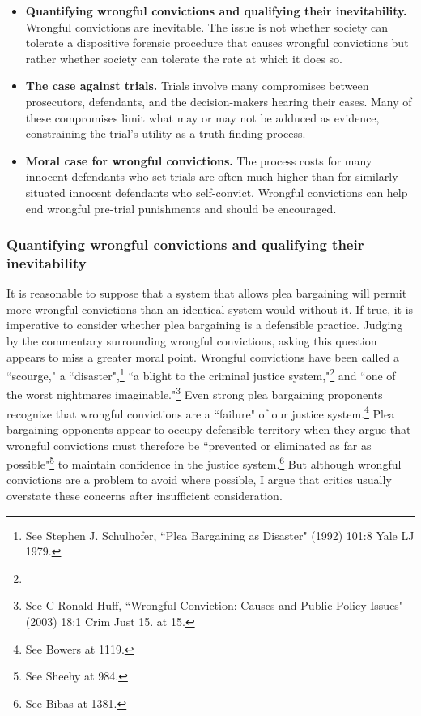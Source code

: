 \begin{itemize}
    \item \textbf{Quantifying wrongful convictions and qualifying their inevitability.} Wrongful convictions are inevitable. The issue is not whether society can tolerate a dispositive forensic procedure that causes wrongful convictions but rather whether society can tolerate the rate at which it does so.
    \item \textbf{The case against trials.} Trials involve many compromises between prosecutors, defendants, and the decision-makers hearing their cases. Many of these compromises limit what may or may not be adduced as evidence, constraining the trial's utility as a truth-finding process.
    \item \textbf{Moral case for wrongful convictions.} The process costs for many innocent defendants who set trials are often much higher than for similarly situated innocent defendants who self-convict. Wrongful convictions can help end wrongful pre-trial punishments and should be encouraged.
    
\end{itemize}

\subsubsection{Quantifying wrongful convictions and qualifying their inevitability}

It is reasonable to suppose that a system that allows plea bargaining will permit more wrongful convictions than an identical system would without it. If true, it is imperative to consider whether plea bargaining is a defensible practice. Judging by the commentary surrounding wrongful convictions, asking this question appears to miss a greater moral point. Wrongful convictions have been called a ``scourge,"\cite{} a ``disaster",\footnote{See Stephen J. Schulhofer, ``Plea Bargaining as Disaster" (1992) 101:8 Yale LJ 1979.} ``a blight to the criminal justice system,"\footnote{} and ``one of the worst nightmares imaginable."\footnote{See C Ronald Huff, ``Wrongful Conviction: Causes and Public Policy Issues" (2003) 18:1 Crim Just 15. at 15.} Even strong plea bargaining proponents recognize that wrongful convictions are a ``failure" of our justice system.\footnote{See Bowers at 1119.} Plea bargaining opponents appear to occupy defensible territory when they argue that wrongful convictions must therefore be ``prevented or eliminated as far as possible"\footnote{See Sheehy at 984.} to maintain confidence in the justice system.\footnote{See Bibas at 1381.} But although wrongful convictions are a problem to avoid where possible, I argue that critics usually overstate these concerns after insufficient consideration.

